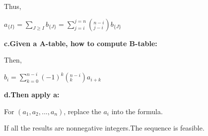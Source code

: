 \documentclass[12pt,a4]{article}
\theoremstyle{exercise}
\begin{document}
     Thus, 
     \begin{center}
     $a_{\{I\}}=\sum \limits_{J\ge I}b_{\{J\}}=\sum \limits_{j=i}^{j=n} (_{j-i}^{n-i}) b_{\{J\}}$
	 \end{center}
     

     \textbf{c.Given a A-table, how to compute B-table:}

     Then,

     \begin{center}
     $b_i=\sum \limits_{k=0}^{n-i} (-1)^k (_{k}^{n-i} )a_{i+k}$
     \end{center}

     \textbf{d.Then apply a:}
     
     For $(a_1,a_2,...,a_n)$, replace the $a_i$ into the formula.
     
     If all the results are nonnegative integers.The sequence is feasible.
     
\end{document}
